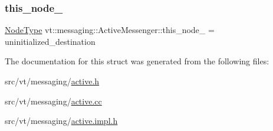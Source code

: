 \mbox{\label{structvt_1_1messaging_1_1_active_messenger_a44428f493f635833b6b8da6a6dfcf08f}} 
\subsubsection{\texorpdfstring{this\+\_\+node\+\_\+}{this\_node\_}}
{\footnotesize\ttfamily \hyperlink{namespacevt_a866da9d0efc19c0a1ce79e9e492f47e2}{Node\+Type} vt\+::messaging\+::\+Active\+Messenger\+::this\+\_\+node\+\_\+ = uninitialized\+\_\+destination\hspace{0.3cm}{\ttfamily [private]}}



The documentation for this struct was generated from the following files\+:\begin{DoxyCompactItemize}
\item 
src/vt/messaging/\hyperlink{active_8h}{active.\+h}\item 
src/vt/messaging/\hyperlink{active_8cc}{active.\+cc}\item 
src/vt/messaging/\hyperlink{active_8impl_8h}{active.\+impl.\+h}\end{DoxyCompactItemize}
